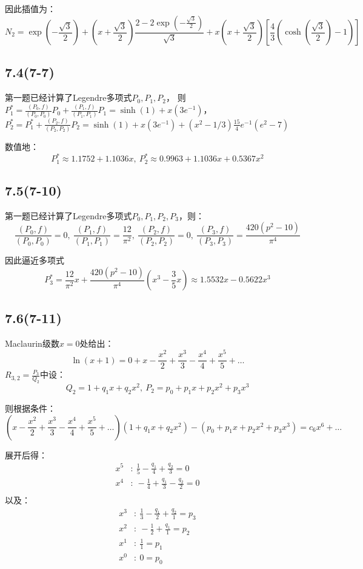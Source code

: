 \documentclass[UTF8,zihao=5]{ctexart}
\begin{document}
因此插值为：
$$
    N_2=\exp(-\frac{\sqrt{3}}{2}) + (x+\frac{\sqrt{3}}{2})\frac{2-2\exp(-\frac{\sqrt{3}}{2})}{\sqrt{3}}
    +x(x+\frac{\sqrt{3}}{2})\left[\frac{4}{3}(\cosh(\frac{\sqrt{3}}{2})-1)\right]
$$

\subsection*{7.4(7-7)}

第一题已经计算了Legendre多项式$P_0,P_1,P_2$，
则$P_1^*=\frac{(P_0,f)}{(P_0,P_0)}P_0+\frac{(P_1,f)}{(P_1,P_1)}P_1=\sinh(1)+x(3e^{-1})$，
$P_2^*=P_1^*+\frac{(P_2,f)}{(P_2,P_2)}P_2=\sinh(1)+x(3e^{-1})+(x^2-1/3)\frac{15}{4}e^{-1}(e^2-7)$

数值地：
$$
    P_1^*\approx 1.1752+1.1036x,\ P_2^*\approx 0.9963+1.1036x+0.5367x^2
$$

\subsection*{7.5(7-10)}
第一题已经计算了Legendre多项式$P_0,P_1,P_2,P_3$，则：
$$
    \frac{(P_0,f)}{(P_0,P_0)}=0,\
    \frac{(P_1,f)}{(P_1,P_1)}=\frac{12}{\pi^2},\
    \frac{(P_2,f)}{(P_2,P_2)}=0,\
    \frac{(P_3,f)}{(P_3,P_3)}=\frac{420(p^2-10)}{\pi^4}
$$

因此逼近多项式
$$
    P_3^*=\frac{12}{\pi^2}x+\frac{420(p^2-10)}{\pi^4}(x^3-\frac{3}{5}x)
    \approx 1.5532x -0.5622x^3
$$

\subsection*{7.6(7-11)}

Maclaurin级数$x=0$处给出：
$$
    \ln(x+1)=0+x-\frac{x^2}{2}+\frac{x^3}{3}-\frac{x^4}{4}+\frac{x^5}{5}+\dots
$$
$R_{3,2}=\frac{P_3}{Q_2}$中设：
$$
    Q_2=1+q_1x+q_2x^2,\ P_2=p_0+p_1x+p_2x^2+p_3x^3
$$

则根据条件：
$$
    (x-\frac{x^2}{2}+\frac{x^3}{3}-\frac{x^4}{4}+\frac{x^5}{5}+\dots)(1+q_1x+q_2x^2)
    -
    (p_0+p_1x+p_2x^2+p_3x^3)=c_{6}x^6+\dots
$$

展开后得：
$$
    \begin{aligned}
        x^5 & :\ \frac{1}{5}-\frac{q_1}{4}+\frac{q_2}{3}=0  \\
        x^4 & :\ -\frac{1}{4}+\frac{q_1}{3}-\frac{q_2}{2}=0 \\
    \end{aligned}
$$
以及：
$$
    \begin{aligned}
        x^3 & :\ \frac{1}{3}-\frac{q_1}{2}+\frac{q_2}{1}=p_3 \\
        x^2 & :\ -\frac{1}{2}+\frac{q_1}{1}=p_2              \\
        x^1 & :\ \frac{1}{1}=p_1                             \\
        x^0 & :\ 0=p_0                                       \\
    \end{aligned}
$$
\end{document}
